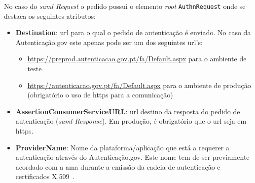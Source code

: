 No caso do \textit{\acrshort{saml} Request} o pedido possui o elemento \textit{root} \texttt{AuthnRequest} onde se destaca os seguintes atributos:
\begin{itemize}
    \item \textbf{Destination}: \acrshort{url} para o qual o pedido de autenticação é enviado. No caso da Autenticação.gov este apenas pode ser um dos seguintes \acrshort{url}'s:
    \begin{itemize}
        \item \url{https://preprod.autenticacao.gov.pt/fa/Default.aspx} para o ambiente de teste
        \item \url{https://autenticacao.gov.pt/fa/Default.aspx} para o ambiente de produção (obrigatório o uso de \acrshort{https} para a comunicação)
    \end{itemize}
    \item \textbf{AssertionConsumerServiceURL}: \acrshort{url} destino da resposta do pedido de autenticação (\textit{\acrshort{saml} Response}). Em produção, é obrigatório que o \acrshort{url} seja em \acrshort{https}.
    \item \textbf{ProviderName}: Nome da plataforma/aplicação que está a requerer a autenticação através do Autenticação.gov. Este nome tem de ser previamente acordado com a \acrshort{ama} durante a emissão da cadeia de autenticação e certificados X.509~\cite{otavioTese}.
\end{itemize}

